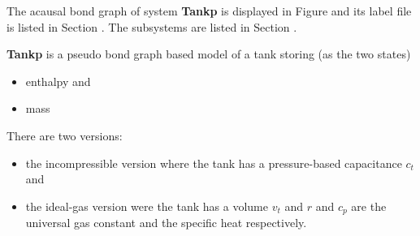 

   The acausal bond graph of system \textbf{Tankp} is
   displayed in Figure  and its label
   file is listed in Section .
   The subsystems are listed in Section .

\textbf{Tankp} is a pseudo bond graph based model of a tank storing
(as the two states)
\begin{itemize}
\item enthalpy and 
\item mass
\end{itemize}

There are two versions:
\begin{itemize}
\item the incompressible version where the tank has a pressure-based
  capacitance $c_t$ and
\item the ideal-gas version were the tank has a volume  $v_t$ and $r$
  and $c_p$ are the universal gas constant and the specific heat respectively.
\end{itemize}








